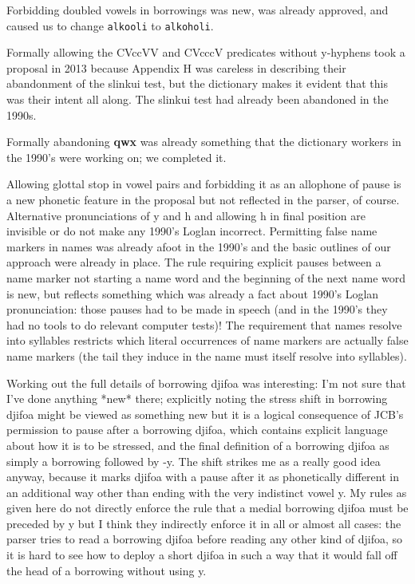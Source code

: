 \documentclass{article}
\begin{document}
 Forbidding doubled vowels in borrowings was new, was already approved, and caused us to change
  {\tt alkooli} to {\tt alkoholi}.

 Formally allowing the CVccVV and CVcccV predicates without y-hyphens took a proposal in 2013 because
  Appendix H was careless in describing their abandonment of the slinkui test, but the dictionary
  makes it evident that this was their intent all along.  The slinkui test had already been
  abandoned in the 1990s.

 Formally abandoning {\bf qwx} was already something that the dictionary workers in the 1990's were working
  on; we completed it.

 Allowing glottal stop in vowel pairs and forbidding it as an allophone of pause is a new phonetic
  feature in the proposal but not reflected in the parser, of course.   Alternative pronunciations of
  y and h and allowing h in final position are invisible or do not make any 1990's Loglan incorrect.
 Permitting false name markers in names was already afoot in the 1990's and the basic outlines of our
  approach were already in place.  The rule requiring explicit pauses between a name marker not starting
  a name word and the beginning of the next name word is new, but reflects something which was already
  a fact about 1990's Loglan pronunciation:  those pauses had to be made in speech
 (and in the 1990's they had no tools to do relevant computer tests)!  The requirement
  that names resolve into syllables restricts which literal occurrences of name markers are actually
  false name markers (the tail they induce in the name must itself resolve into syllables).

 Working out the full details of borrowing djifoa was interesting:  I'm not sure that I've done anything
 *new* there;  explicitly noting the stress shift in borrowing djifoa might be viewed as something
 new but it is a logical consequence of JCB's permission to pause after a borrowing djifoa, which contains
  explicit language about how it is to be stressed, and the
  final definition of a borrowing djifoa as simply a borrowing followed by -y.  The shift strikes
  me as a really good idea anyway, because it marks djifoa with a pause after it as phonetically different
  in an additional way other than ending with the very indistinct vowel y.  My rules as given here do not
  directly enforce the rule that a medial borrowing djifoa must be preceded by y but I think they indirectly
  enforce it in all or almost all cases:  the parser tries to read a borrowing djifoa before reading
  any other kind of djifoa, so it is hard to see how to deploy a short djifoa in such a way that it would
  fall off the head of a borrowing without using y.
\end{document}
